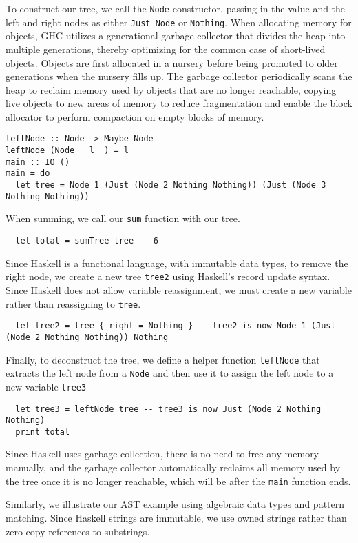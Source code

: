 \documentclass[12pt, letterpaper]{article}
\begin{document}
To construct our tree, we call the \texttt{Node} constructor, passing in the value and the left and right nodes as either \texttt{Just Node} or \texttt{Nothing}. When allocating memory for objects, GHC utilizes a generational garbage collector that divides the heap into multiple generations, thereby optimizing for the common case of short-lived objects. Objects are first allocated in a nursery before being promoted to older generations when the nursery fills up. The garbage collector periodically scans the heap to reclaim memory used by objects that are no longer reachable, copying live objects to new areas of memory to reduce fragmentation and enable the block allocator to perform compaction on empty blocks of memory.\autocite{ghc-gc}
\begin{verbatim}
leftNode :: Node -> Maybe Node
leftNode (Node _ l _) = l
main :: IO ()
main = do
  let tree = Node 1 (Just (Node 2 Nothing Nothing)) (Just (Node 3 Nothing Nothing))
\end{verbatim}
When summing, we call our \texttt{sum} function with our tree.
\begin{verbatim}
  let total = sumTree tree -- 6
\end{verbatim}
Since Haskell is a functional language, with immutable data types, to remove the right node, we create a new tree \texttt{tree2} using Haskell's record update syntax. Since Haskell does not allow variable reassignment, we must create a new variable rather than reassigning to \texttt{tree}.
\begin{verbatim}
  let tree2 = tree { right = Nothing } -- tree2 is now Node 1 (Just (Node 2 Nothing Nothing)) Nothing
\end{verbatim}
Finally, to deconstruct the tree, we define a helper function \texttt{leftNode} that extracts the left node from a \texttt{Node} and then use it to assign the left node to a new variable \texttt{tree3}
\begin{verbatim}
  let tree3 = leftNode tree -- tree3 is now Just (Node 2 Nothing Nothing)
  print total
\end{verbatim}

Since Haskell uses garbage collection, there is no need to free any memory manually, and the garbage collector automatically reclaims all memory used by the tree once it is no longer reachable, which will be after the \texttt{main} function ends.

Similarly, we illustrate our AST example using algebraic data types and pattern matching. Since Haskell strings are immutable, we use owned strings rather than zero-copy references to substrings.\autocite[\href{https://www.haskell.org/onlinereport/haskell2010/haskellch6.html}{chap.~6~\S1.2}]{haskell-report}
\end{document}
